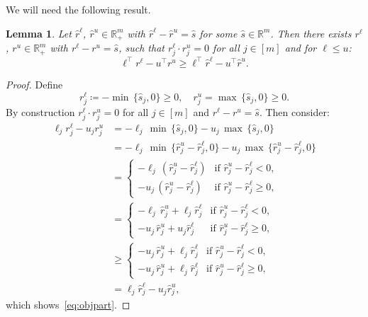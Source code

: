 \documentclass[10pt, a4paper]{article}
\newcommand{\define}{\coloneqq}
\newcommand{\T}{^{\top}}
\newcommand{\R}{\mathds{R}}
\newtheorem{lemma}[theorem]{Lemma}
\begin{document}
We will need the following result.

\begin{lemma}\label{lemma:ComplemenatrySolution}
  Let $\hat{r}^\ell$, $\hat{r}^u \in \R^m_+$ with
  $\hat{r}^\ell - \hat{r}^u = \hat{s}$ for some $\hat{s} \in \R^m$. Then
  there exists $r^\ell$, $r^u \in \R^m_+$ with $r^\ell - r^u = \hat{s}$, such
  that $r_j^\ell \cdot r_j^u = 0$ for all $j \in [m]$ and for
  $\ell \leq u$:
  \begin{equation}\label{eq:objpart}
    \ell\T r^\ell - u\T r^u \geq \ell\T \hat{r}^\ell - u\T \hat{r}^u.
  \end{equation}
\end{lemma}

\begin{proof}
  Define
  \[
    r^\ell_j \define - \min\,\{\hat{s}_j, 0\} \geq 0,
    \quad
    r^u_j = \max\,\{\hat{s}_j, 0\} \geq 0.
  \]
  By construction $r^\ell_j \cdot r^u_j = 0$ for all
  $j \in [m]$ and $r^\ell - r^u = \hat{s}$. Then consider:
  \begin{align*}
    \ell_j r^\ell_j - u_j r^u_j & = - \ell_j\, \min\,\{\hat{s}_j, 0\} - u_j\, \max\,\{\hat{s}_j, 0\}\\
    & = - \ell_j\, \min\,\{\hat{r}^u_j - \hat{r}^\ell_j, 0\} - u_j\, \max\,\{\hat{r}^u_j - \hat{r}^\ell_j, 0\}\\
    & = \begin{cases}
      - \ell_j\, (\hat{r}^u_j - \hat{r}^\ell_j) & \text{if } \hat{r}^u_j - \hat{r}^\ell_j < 0,\\
      - u_j\, (\hat{r}^u_j - \hat{r}^\ell_j) & \text{if } \hat{r}^u_j - \hat{r}^\ell_j \geq 0,
    \end{cases}\\
    & = \begin{cases}
      - \ell_j\, \hat{r}^u_j + \ell_j \hat{r}^\ell_j & \text{if } \hat{r}^u_j - \hat{r}^\ell_j < 0,\\
      - u_j\, \hat{r}^u_j + u_j \hat{r}^\ell_j & \text{if } \hat{r}^u_j - \hat{r}^\ell_j \geq 0,
    \end{cases}\\
    & \geq \begin{cases}
      - u_j\, \hat{r}^u_j + \ell_j \hat{r}^\ell_j & \text{if }  \hat{r}^u_j - \hat{r}^\ell_j < 0,\\
      - u_j\, \hat{r}^u_j + \ell_j \hat{r}^\ell_j & \text{if } \hat{r}^u_j - \hat{r}^\ell_j \geq 0,
    \end{cases}\\
    & = \ell_j \hat{r}^\ell_j - u_j \hat{r}^u_j,
  \end{align*}
  which shows~\eqref{eq:objpart}.
\end{proof}
\end{document}
